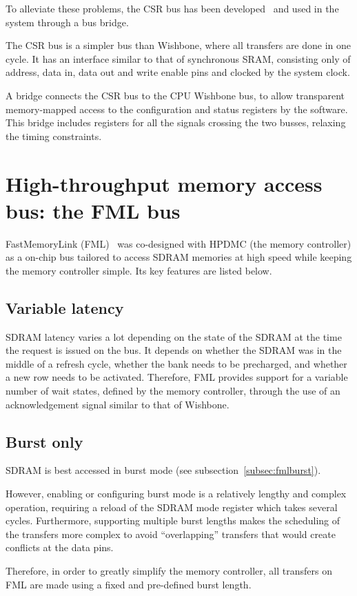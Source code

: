 \documentclass[a4paper,11pt]{kthesis}
\begin{document}
To alleviate these problems, the CSR bus has been developed~\cite{csr} and used in the system through a bus bridge.

The CSR bus is a simpler bus than Wishbone, where all transfers are done in one cycle. It has an interface similar to that of synchronous SRAM, consisting only of address, data in, data out and write enable pins and clocked by the system clock.

A bridge connects the CSR bus to the CPU Wishbone bus, to allow transparent memory-mapped access to the configuration and status registers by the software. This bridge includes registers for all the signals crossing the two busses, relaxing the timing constraints.

\section{High-throughput memory access bus: the FML bus}
FastMemoryLink (FML)~\cite{fml} was co-designed with HPDMC (the memory controller) as a on-chip bus tailored to access SDRAM memories at high speed while keeping the memory controller simple. Its key features are listed below.

\subsection{Variable latency}
SDRAM latency varies a lot depending on the state of the SDRAM at the time the request is issued on the bus. It depends on whether the SDRAM was in the middle of a refresh cycle, whether the bank needs to be precharged, and whether a new row needs to be activated. Therefore, FML provides support for a variable number of wait states, defined by the memory controller, through the use of an acknowledgement signal similar to that of Wishbone.

\subsection{Burst only}
SDRAM is best accessed in burst mode (see subsection~\ref{subsec:fmlburst}).

However, enabling or configuring burst mode is a relatively lengthy and complex operation, requiring a reload of the SDRAM mode register which takes several cycles. Furthermore, supporting multiple burst lengths makes the scheduling of the transfers more complex to avoid ``overlapping'' transfers that would create conflicts at the data pins.

Therefore, in order to greatly simplify the memory controller, all transfers on FML are made using a fixed and pre-defined burst length.
\end{document}

